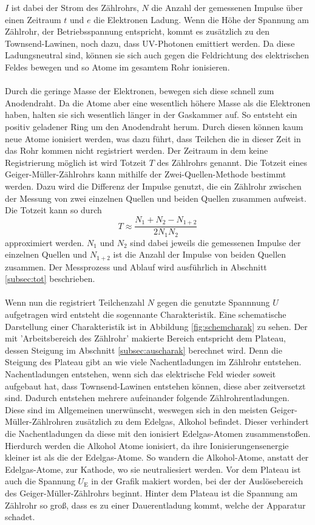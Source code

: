 $I$ ist dabei der Strom des Zählrohrs, $N$ die Anzahl der gemessenen Impulse über einen Zeitraum $t$ und $e$ die Elektronen Ladung.
Wenn die Höhe der Spannung am Zählrohr, der Betriebsspannung entspricht, kommt es zusätzlich zu den Townsend-Lawinen, noch dazu, dass UV-Photonen emittiert werden.
Da diese Ladungsneutral sind, können sie sich auch gegen die Feldrichtung des elektrischen Feldes bewegen und so Atome im gesamtem Rohr ionisieren.
\\\\
Durch die geringe Masse der Elektronen, bewegen sich diese schnell zum Anodendraht.
Da die Atome aber eine wesentlich höhere Masse als die Elektronen haben, halten sie sich wesentlich länger in der Gaskammer auf.
So entsteht ein positiv geladener Ring um den Anodendraht herum.
Durch diesen können kaum neue Atome ionisiert werden, was dazu führt, dass Teilchen die in dieser Zeit in das Rohr kommen nicht registriert werden.
Der Zeitraum in dem keine Registrierung möglich ist wird Totzeit $T$ des Zählrohrs genannt.
Die Totzeit eines Geiger-Müller-Zählrohrs kann mithilfe der Zwei-Quellen-Methode bestimmt werden.
Dazu wird die Differenz der Impulse genutzt, die ein Zählrohr zwischen der Messung von zwei einzelnen Quellen und beiden Quellen zusammen aufweist.
Die Totzeit kann so durch
\begin{equation}
    T \approx \frac{N_1+N_2-N_{1+2}}{2N_1 N_2}
    \label{eq:totzeit}
\end{equation} 
approximiert werden.
$N_1$ und $N_2$ sind dabei jeweils die gemessenen Impulse der einzelnen Quellen und $N_{1+2}$ ist die Anzahl der Impulse von beiden Quellen zusammen.
Der Messprozess und Ablauf wird ausführlich in Abschnitt \ref{subsec:tot} beschrieben.
\\\\
Wenn nun die registriert Teilchenzahl $N$ gegen die genutzte Spannnung $U$ aufgetragen wird entsteht die sogennante Charakteristik.
Eine schematische Darstellung einer Charakteristik ist in Abbildung \ref{fig:schemcharak} zu sehen.
Der mit 'Arbeitsbereich des Zählrohr' makierte Bereich entspricht dem Plateau, dessen Steigung im Abschnitt \ref{subsec:auscharak} berechnet wird.
Denn die Steigung des Plateau gibt an wie viele Nachentladungen im Zählrohr entstehen.
Nachentladungen entstehen, wenn sich das elektrische Feld wieder soweit aufgebaut hat, dass Townsend-Lawinen entstehen können, diese aber zeitversetzt sind.
Dadurch entstehen mehrere aufeinander folgende Zählrohrentladungen.
Diese sind im Allgemeinen unerwünscht, weswegen sich in den meisten Geiger-Müller-Zählrohren zusätzlich zu dem Edelgas, Alkohol befindet.
Dieser verhindert die Nachentladungen da diese mit den ionisiert Edelgas-Atomen zusammenstoßen.
Hierdurch werden die Alkohol Atome ionisiert, da ihre Ionisierungensenergie kleiner ist als die der Edelgas-Atome.
So wandern die Alkohol-Atome, anstatt der Edelgas-Atome, zur Kathode, wo sie neutraliesiert werden.
Vor dem Plateau ist auch die Spannung $U_\text{E}$ in der Grafik makiert worden, bei der der Auslösebereich des Geiger-Müller-Zählrohrs beginnt.
Hinter dem Plateau ist die Spannung am Zählrohr so groß, dass es zu einer Dauerentladung kommt, welche der Apparatur schadet.

